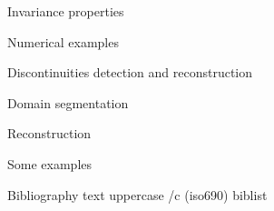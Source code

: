 \sec Invariance properties


\sec[numericalsec] Numerical examples


\chap Discontinuities detection\nl ^^J
      and reconstruction

\sec Domain segmentation


\sec Reconstruction


\sec Some examples












\def\_mtext#1{BIBLIOGRAPHY}
\let\uppercase\ignoreit
\nonum\chap Bibliography
\let\_mtext\omtext
\let\uppercase\_uppercase
\def\_opwarning#1{}
\usebib/c (iso690) biblist


\bye
